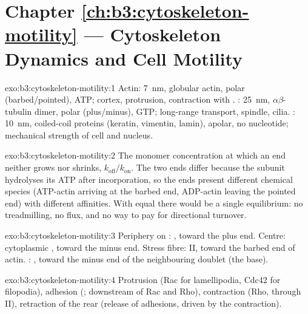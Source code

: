 \section*{Chapter \ref{ch:b3:cytoskeleton-motility} --- Cytoskeleton Dynamics and Cell Motility}

\begin{solution}{exo:b3:cytoskeleton-motility:1}
Actin: \qty{7}{nm}, globular actin, polar (barbed/pointed), ATP;
cortex, protrusion, contraction with . : \qty{25}{nm},
$\alpha\beta$-tubulin dimer, polar (plus/minus), GTP; long-range
transport, spindle, cilia. : \qty{10}{nm},
coiled-coil proteins (keratin, vimentin, lamin), apolar, no nucleotide;
mechanical strength of cell and nucleus.
\end{solution}

\begin{solution}{exo:b3:cytoskeleton-motility:2}
The monomer concentration at which an end neither grows nor shrinks,
$k_{\text{off}}/k_{\text{on}}$. The two ends differ because the subunit
hydrolyses its ATP after incorporation, so the ends present different
chemical species (ATP-actin arriving at the barbed end, ADP-actin
leaving the pointed end) with different affinities. With equal  there would be a single equilibrium: no treadmilling,
no flux, and no way to pay for directional turnover.
\end{solution}

\begin{solution}{exo:b3:cytoskeleton-motility:3}
Periphery on : , toward the plus end. Centre:
cytoplasmic , toward the minus end. Stress fibre:  II,
toward the barbed end of actin. : , toward the
minus end of the neighbouring doublet (the base).
\end{solution}

\begin{solution}{exo:b3:cytoskeleton-motility:4}
Protrusion (Rac for lamellipodia, Cdc42 for filopodia), adhesion
(; downstream of Rac and Rho), contraction (Rho, through
 II), retraction of the rear (release of adhesions, driven by the
contraction).
\end{solution}

